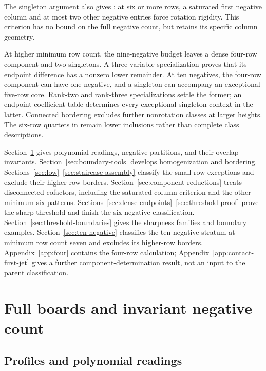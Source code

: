 \documentclass[11pt,a4paper]{amsart}
\numberwithin{equation}{section}
\theoremstyle{plain}
\theoremstyle{definition}
\begin{document}
The singleton argument also gives : at six
or more rows, a saturated first negative column and at most two other
negative entries force rotation rigidity.  This criterion has no bound
on the full negative count, but retains its specific column geometry.

At higher minimum row count, the nine-negative budget leaves a dense
four-row component and two singletons.  A three-variable specialization
proves that its endpoint difference has a nonzero lower remainder.
At ten negatives, the four-row component can have one negative, and a
singleton can accompany an exceptional five-row core.  Rank-two and
rank-three specializations settle the former; an endpoint-coefficient
table determines every exceptional singleton context in the latter.
Connected bordering excludes further nonrotation classes at larger
heights.  The six-row quartets in  remain
lower inclusions rather than complete class descriptions.

Section~\ref{sec:boards} gives polynomial readings, negative partitions,
and their overlap invariants.  Section~\ref{sec:boundary-tools} develops
homogenization and bordering.  Sections~\ref{sec:low}--\ref{sec:staircase-assembly}
classify the small-row exceptions and exclude their higher-row borders.
Section~\ref{sec:component-reductions} treats disconnected cofactors,
including the saturated-column criterion and the other minimum-six
patterns.  Sections~\ref{sec:dense-endpoints}--\ref{sec:threshold-proof}
prove the sharp threshold and finish the six-negative classification.
Section~\ref{sec:threshold-boundaries} gives the sharpness families and
boundary examples.  Section~\ref{sec:ten-negative} classifies the
ten-negative stratum at minimum row count seven and excludes its higher-row
borders.  Appendix~\ref{app:four} contains the four-row calculation;
Appendix~\ref{app:contact-first-jet} gives a further component-determination
result, not an input to the parent classification.

\section{Full boards and invariant negative count}\label{sec:boards}

\subsection{Profiles and polynomial readings}
\end{document}
